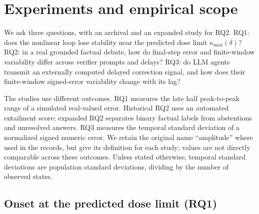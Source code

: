 \documentclass[11pt]{article}
\theoremstyle{definition}
\begin{document}
\section{Experiments and empirical scope}\label{sec:emp}

We ask three questions, with an archival and an expanded study for RQ2. RQ1: does the nonlinear loop lose stability
near the predicted dose limit $\kappa_{\max}(\delta)$? RQ2: in a real grounded factual debate,
how do final-step error and finite-window variability differ across verifier prompts and delays?
RQ3: do LLM agents transmit an externally computed delayed correction signal, and how does their
finite-window signed-error variability change with its lag?

The studies use different outcomes. RQ1 measures the late half peak-to-peak range of a simulated
real-valued error. Historical RQ2 uses an automated entailment score; expanded RQ2 separates
binary factual labels from abstentions and unresolved answers. RQ3 measures the temporal
standard deviation of a normalized signed numeric error. We retain the original name
``amplitude'' where used in the records, but give its definition for each study; values are
not directly comparable across these outcomes. Unless stated otherwise, temporal standard
deviations are population standard deviations, dividing by the number of observed states.

\subsection{Onset at the predicted dose limit (RQ1)}
\end{document}
